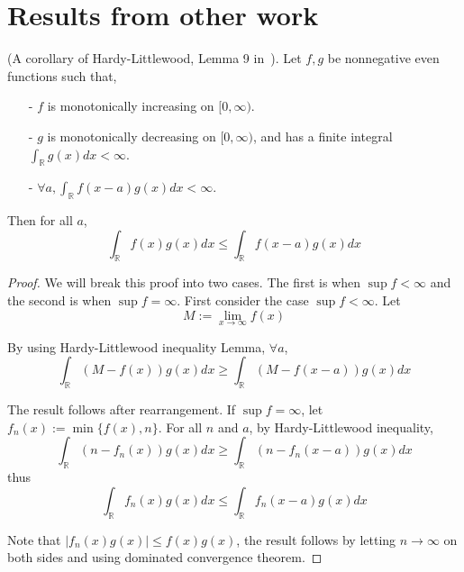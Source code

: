 \section{Results from other work}
\label{app:other_work}



\begin{lemma}
    (A corollary of Hardy-Littlewood, Lemma 9 in~\citet{chen2023mechanism}). Let $f, g$ be nonnegative even functions such that,
    \begin{itemize}
        \item[-] $f$ is monotonically increasing on $[0, \infty)$.
        \item[-] $g$ is monotonically decreasing on $[0, \infty)$, and has a finite integral $\int_{\mathbb{R}} g(x) d x<\infty$.
        \item[-] $\forall a, \int_{\mathbb{R}} f(x-a) g(x) d x<\infty$.
    \end{itemize}



Then for all $a$,
$$
\int_{\mathbb{R}} f(x) g(x) d x \leq \int_{\mathbb{R}} f(x-a) g(x) d x
$$
\end{lemma}



\begin{proof}
     We will break this proof into two cases. The first is when $\sup f<\infty$ and the second is when $\sup f=\infty$. First consider the case $\sup f<\infty$. Let
$$
M:=\lim _{x \rightarrow \infty} f(x)
$$

By using Hardy-Littlewood inequality Lemma, $\forall a$,
$$
\int_{\mathbb{R}}(M-f(x)) g(x) d x \geq \int_{\mathbb{R}}(M-f(x-a)) g(x) d x
$$

The result follows after rearrangement.
If $\sup f=\infty$, let $f_n(x):=\min \{f(x), n\}$. For all $n$ and $a$, by Hardy-Littlewood inequality,
$$
\int_{\mathbb{R}}\left(n-f_n(x)\right) g(x) d x \geq \int_{\mathbb{R}}\left(n-f_n(x-a)\right) g(x) d x
$$
thus
$$
\int_{\mathbb{R}} f_n(x) g(x) d x \leq \int_{\mathbb{R}} f_n(x-a) g(x) d x
$$

Note that $\left|f_n(x) g(x)\right| \leq f(x) g(x)$, the result follows by letting $n \rightarrow \infty$ on both sides and using dominated convergence theorem.


\end{proof}




